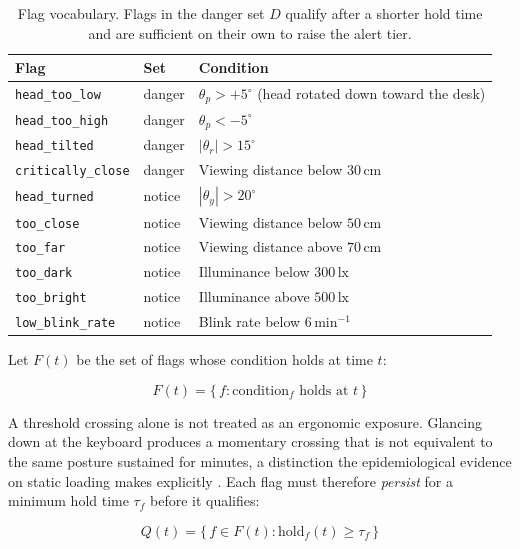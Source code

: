 \begin{table}[htbp]
\centering
\caption{Flag vocabulary. Flags in the danger set $D$ qualify after a shorter hold time and are
sufficient on their own to raise the alert tier.}
\label{tab:flags}
\begin{tabular}{@{}llp{6.6cm}@{}}
\toprule
\textbf{Flag} & \textbf{Set} & \textbf{Condition} \\
\midrule
\texttt{head\_too\_low}    & danger & $\theta_p > +5^\circ$ (head rotated down toward the desk) \\
\texttt{head\_too\_high}   & danger & $\theta_p < -5^\circ$ \\
\texttt{head\_tilted}      & danger & $|\theta_r| > 15^\circ$ \\
\texttt{critically\_close} & danger & Viewing distance below $30\,\text{cm}$ \\
\texttt{head\_turned}      & notice & $|\theta_y| > 20^\circ$ \\
\texttt{too\_close}        & notice & Viewing distance below $50\,\text{cm}$ \\
\texttt{too\_far}          & notice & Viewing distance above $70\,\text{cm}$ \\
\texttt{too\_dark}         & notice & Illuminance below $300\,\text{lx}$ \\
\texttt{too\_bright}       & notice & Illuminance above $500\,\text{lx}$ \\
\texttt{low\_blink\_rate}  & notice & Blink rate below $6\,\text{min}^{-1}$ \\
\bottomrule
\end{tabular}
\end{table}

Let $F(t)$ be the set of flags whose condition holds at time $t$:

\begin{equation}
F(t) = \{\, f : \text{condition}_f \text{ holds at } t \,\}
\label{eq:flags}
\end{equation}

A threshold crossing alone is not treated as an ergonomic exposure. Glancing down at the keyboard
produces a momentary crossing that is not equivalent to the same posture sustained for minutes, a
distinction the epidemiological evidence on static loading makes explicitly \cite{ref2,ref12,ref18}.
Each flag must therefore \emph{persist} for a minimum hold time $\tau_f$ before it qualifies:

\begin{equation}
Q(t) = \{\, f \in F(t) : \text{hold}_f(t) \geq \tau_f \,\}
\label{eq:qualify}
\end{equation}

